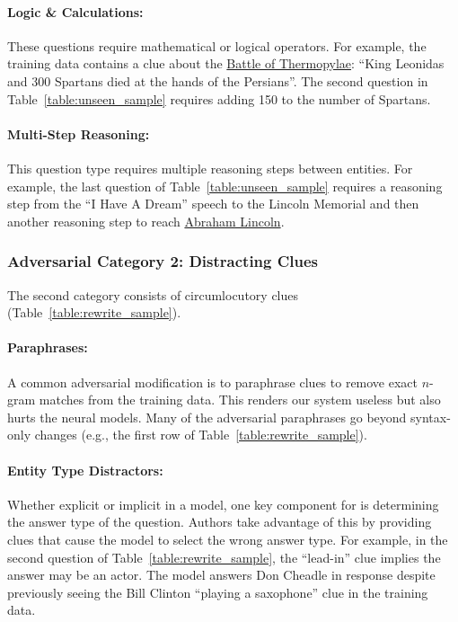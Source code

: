 \paragraph{Logic \& Calculations:} These questions require mathematical
or logical operators. For example, the training data
contains a clue about the \underline{Battle of Thermopylae}: ``King
Leonidas and 300 Spartans died at the hands of the Persians''. The
second question in Table~\ref{table:unseen_sample} requires adding
150 to the number of Spartans.~\smallskip 

\paragraph{Multi-Step Reasoning:} This question type requires multiple reasoning
steps between entities. For example, the last question of
Table~\ref{table:unseen_sample} requires a reasoning step
from the ``I Have A Dream'' speech to the Lincoln Memorial and then 	another
reasoning step to reach \underline{Abraham Lincoln}. 

\subsubsection{Adversarial Category 2: Distracting Clues}
\label{sec:changes_language}

The second category consists of circumlocutory clues (Table~\ref{table:rewrite_sample}).~\smallskip

\paragraph{Paraphrases:} A common adversarial modification is to
paraphrase clues to remove exact $n$-gram matches from the training data. This
renders our  system useless but also hurts the neural models. Many of
the adversarial paraphrases go beyond syntax-only changes (e.g., the first row of Table~\ref{table:rewrite_sample}).~\smallskip

\paragraph{Entity Type Distractors:} Whether explicit or implicit in a model, one key component for  is determining the
answer type of the question. Authors take advantage of this
by providing clues that cause the model to select the wrong answer type. For example,
in the second question of Table~\ref{table:rewrite_sample}, the ``lead-in'' clue implies
the answer may be an actor. The  model answers Don Cheadle in response despite previously
seeing the Bill Clinton ``playing a saxophone'' clue in the training data.~\smallskip

